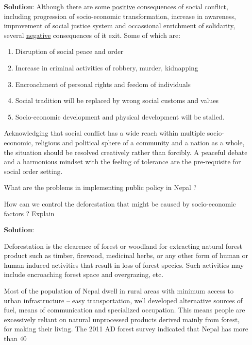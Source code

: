 \documentclass[
  openany]{book}
\newcommand{\question}{\item}
\newenvironment{solution}{ {\bfseries Solution}:}{}
\begin{document}
\begin{questions}
\begin{solution}
Although there are some \underline{positive} consequences of social conflict, including progression of socio-economic transformation, increase in awareness, improvement of social justice system and occassional enrichment of solidarity, several \underline{negative} consequences of it exit. Some of which are:

\begin{enumerate}
\item Disruption of social peace and order
\item Increase in criminal activities of robbery, murder, kidnapping
\item Encroachment of personal rights and feedom of individuals
\item Social tradition will be replaced by wrong social customs and values
\item Socio-economic development and physical development will be stalled.
\end{enumerate}

Acknowledging that social conflict has a wide reach within multiple socio-economic, religious and political sphere of a community and a nation as a whole, the situation should be resolved creatively rather than forcibly. A peaceful debate and a harmonious mindset with the feeling of tolerance are the pre-requisite for social order setting.
\end{solution}

\question What are the problems in implementing public policy in Nepal ?

\question How can we control the deforestation that might be caused by socio-economic factors ? Explain

\begin{solution}

Deforestation is the clearence of forest or woodland for extracting natural forest product such as timber, firewood, medicinal herbs, or any other form of human or human induced activities that result in loss of forest species. Such activities may include encroaching forest space and overgrazing, etc.

Most of the population of Nepal dwell in rural areas with minimum access to urban infrastructure -- easy transportation, well developed alternative sources of fuel, means of communication and specialized occupation. This means people are excessively reliant on natural unprocessed products derived mainly from forest, for making their living. The 2011 AD forest survey indicated that Nepal has more than 40%


\end{solution}
\end{questions}
\end{document}
